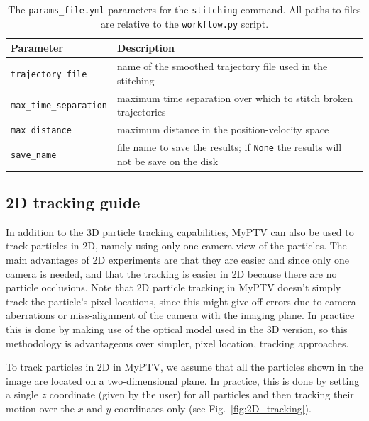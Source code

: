 \documentclass[10pt,a4paper]{article}
\begin{document}
\begin{table}[!ht]
	\centering
	\caption{The \texttt{params\_file.yml} parameters for the \texttt{stitching} command. All paths to files are relative to the \texttt{workflow.py} script.}
	\begin{tabular}{l m{12cm}}
		\hline
		Parameter & Description\\
		\hline
		
		\texttt{trajectory\_file} & name of the smoothed trajectory file used in the stitching \\
		
		\texttt{max\_time\_separation} & maximum time separation over which to stitch broken trajectories \\
		
		\texttt{max\_distance} & maximum distance in the position-velocity space \\
		
		\texttt{save\_name} & file name to save the results; if \texttt{None} the results will not be save on the disk \\
		
		\hline
	\end{tabular}
\end{table}










\subsection{2D tracking guide} \label{sec:2D_tracking}


In addition to the 3D particle tracking capabilities, MyPTV can also be used to track particles in 2D, namely using only one camera view of the particles. The main advantages of 2D experiments are that they are easier and since only one camera is needed, and that the tracking is easier in 2D because there are no particle occlusions. Note that 2D particle tracking in MyPTV doesn't simply track the particle's pixel locations, since this might give off errors due to camera aberrations or miss-alignment of the camera with the imaging plane. In practice this is done by making use of the optical model used in the 3D version, so this methodology is advantageous over simpler, pixel location, tracking approaches. 


To track particles in 2D in MyPTV, we assume that all the particles shown in the image are located on a two-dimensional plane. In practice, this is done by setting a single $z$ coordinate (given by the user) for all particles and then tracking their motion over the $x$ and $y$ coordinates only (see Fig.~\ref{fig:2D_tracking}).
\end{document}
